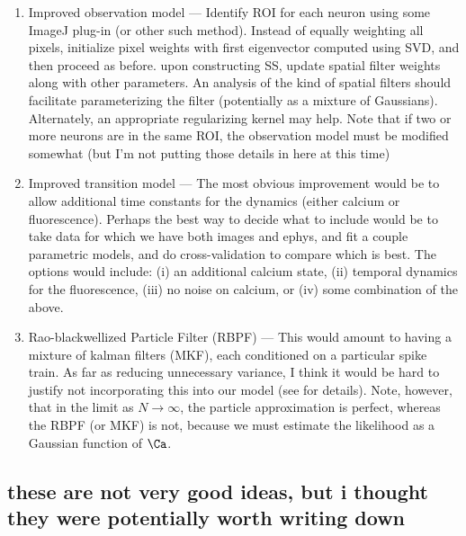 \documentclass[12pt]{article}
\begin{document}
\begin{enumerate}
\item Improved observation model --- Identify ROI for each neuron using some ImageJ plug-in (or other such method).  Instead of equally weighting all pixels, initialize pixel weights with first eigenvector computed using SVD, and then proceed as before.  upon constructing SS, update spatial filter weights along with other parameters.  An analysis of the kind of spatial filters should facilitate parameterizing the filter (potentially as a mixture of Gaussians).  Alternately, an appropriate regularizing kernel may help. Note that if two or more neurons are in the same ROI, the observation model must be modified somewhat (but I'm not putting those details in here at this time) 
\item Improved transition model --- The most obvious improvement would be to allow additional time constants for the dynamics (either calcium or fluorescence).  Perhaps the best way to decide what to include would be to take data for which we have both images and ephys, and fit a couple parametric models, and do cross-validation to compare which is best.  The options would include: (i) an additional calcium state, (ii) temporal dynamics for the fluorescence, (iii) no noise on calcium, or (iv) some combination of the above.  
\item Rao-blackwellized Particle Filter (RBPF) --- This would amount to having a mixture of kalman filters (MKF), each conditioned on a particular spike train.  As far as reducing unnecessary variance, I think it would be hard to justify not incorporating this into our model (see \cite{Chen00} for details). Note, however, that in the limit as $N \rightarrow \infty$, the particle approximation is perfect, whereas the RBPF (or MKF) is not, because we must estimate the likelihood as a Gaussian function of $\Ca$.  
\end{enumerate}

\subsection{these are not very good ideas, but i thought they were potentially worth writing down}
\end{document}
